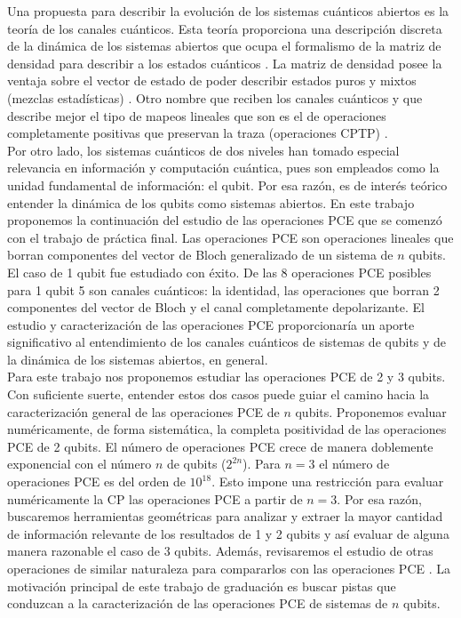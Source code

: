 Una propuesta para describir la evolución de los sistemas cuánticos abiertos
es la teoría de los canales cuánticos. Esta teoría proporciona una descripción
discreta de la dinámica de los sistemas abiertos que ocupa el formalismo
de la matriz de densidad para describir a los estados cuánticos
\cite{nielsen_chuang_2011}. La matriz
de densidad posee la ventaja sobre el vector de estado de poder describir
estados puros y mixtos (mezclas estadísticas) \cite{sakurai_napolitano_2017}. 
Otro nombre que reciben 
los canales cuánticos y que describe mejor el tipo de mapeos lineales 
que son es el de operaciones completamente positivas que preservan la traza 
(operaciones CPTP) \cite{bengtsson_zyczkowski_2017}.\\

Por otro lado, los sistemas cuánticos de dos niveles han tomado especial
relevancia en información y computación cuántica, pues son empleados 
como la unidad fundamental de información: el qubit. Por esa razón, es
de interés teórico entender la dinámica de los qubits como sistemas 
abiertos. En este trabajo proponemos la continuación del estudio de 
las operaciones PCE que se comenzó con el trabajo de práctica final.
Las operaciones PCE son operaciones lineales que borran componentes
del vector de Bloch generalizado de un sistema de $n$ qubits. El caso 
de 1 qubit fue estudiado con éxito. De las 8 operaciones PCE posibles para
1 qubit 5 son canales cuánticos: la identidad, las operaciones que borran 2 
componentes del vector de Bloch y el canal completamente depolarizante.
El estudio y caracterización de las operaciones PCE proporcionaría 
un aporte significativo al entendimiento de los canales cuánticos de
sistemas de qubits y de la dinámica de los sistemas abiertos, en general.\\

Para este trabajo nos proponemos estudiar las operaciones PCE de 
2 y 3 qubits. Con suficiente suerte, entender estos dos casos
puede guiar el camino hacia la caracterización general de las operaciones
PCE de $n$ qubits. Proponemos evaluar numéricamente, de forma sistemática, 
la completa positividad de las operaciones PCE de 2 qubits.   
El número de operaciones PCE crece de manera doblemente exponencial
con el número $n$ de qubits ($2^{2n}$). Para $n=3$ el número de 
operaciones PCE es del orden de $10^{18}$. Esto impone una restricción  
para evaluar numéricamente la CP las operaciones PCE a partir de $n=3$.
Por esa razón, buscaremos herramientas geométricas para analizar 
y extraer la mayor cantidad de información relevante de los 
resultados de 1 y 2 qubits y así evaluar de alguna manera razonable
el caso de 3 qubits. Además, revisaremos el 
estudio de otras operaciones de similar naturaleza para compararlos
con las operaciones PCE \cite{nathanson2007pauli}. 
La motivación principal de este trabajo de graduación 
es buscar pistas que conduzcan a la caracterización de las 
operaciones PCE de sistemas de $n$ qubits.


